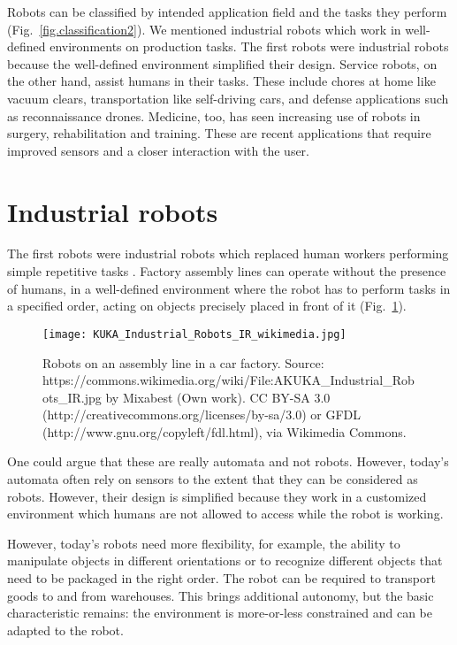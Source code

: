 Robots can be classified by intended application field and the tasks they perform (Fig.~\ref{fig.classification2}). We mentioned industrial robots which work in well-defined environments on production tasks. The first robots were industrial robots because the well-defined environment simplified their design.  Service robots, on the other hand, assist humans in their tasks. These include chores at home like vacuum clears, transportation like self-driving cars, and defense applications such as reconnaissance drones. Medicine, too, has seen increasing use of robots in surgery, rehabilitation and training. These are recent applications that require improved sensors and a closer interaction with the user.

\section{Industrial robots}

The first robots were industrial robots which replaced human workers performing simple repetitive tasks . Factory assembly lines can operate without the presence of humans, in a well-defined environment where the robot has to perform tasks in a specified order, acting on objects precisely placed in front of it (Fig.~\ref{fig.assemblyline}). 

\begin{figure}
\begin{center}
\texttt{[image: KUKA\_Industrial\_Robots\_IR\_wikimedia.jpg]}
\end{center}
\caption{Robots on an assembly line in a car factory. Source: https://commons.wikimedia.org/wiki/File:AKUKA\_Industrial\_Robots\_IR.jpg by Mixabest (Own work). CC BY-SA 3.0 (http://creativecommons.org/licenses/by-sa/3.0) or GFDL (http://www.gnu.org/copyleft/fdl.html), via Wikimedia Commons.}\label{fig.assemblyline}
\end{figure}

One could argue that these are really automata and not robots. However, today's automata often rely on sensors to the extent that they can be considered as robots. However, their design is simplified because they work in a customized environment which humans are not allowed to access while the robot is working.

However, today's robots need more flexibility, for example, the ability to manipulate objects in different orientations or to recognize different objects that need to be packaged in the right order. The robot can be required to transport goods to and from warehouses. This brings additional autonomy, but the basic characteristic remains: the environment is more-or-less constrained and can be adapted to the robot.

